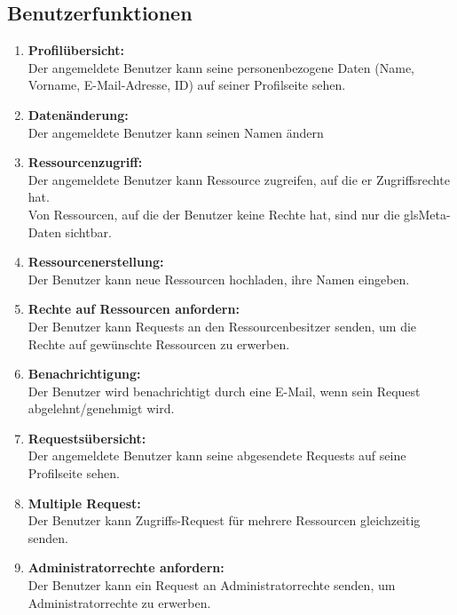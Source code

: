 \documentclass[parskip=full,11pt]{scrartcl}
\def\threedigits#1{%
  \ifnum#1<10 0\fi
  \ifnum#1<1 0\fi
  \number#1}
\begin{document}
\subsection{Benutzerfunktionen}
\begin{enumerate}[label={\textbf{/F\protect\threedigits{\theenumi}0/}}, leftmargin=*]
\item \label{FAB1} \textbf{Profilübersicht:} \\ Der angemeldete Benutzer kann seine personenbezogene Daten (Name, Vorname, E-Mail-Adresse, ID) auf seiner Profilseite sehen.
\item \label{FAB2} \textbf{Datenänderung:} \\ Der angemeldete Benutzer kann seinen Namen ändern
\item \label{FAB3} \textbf{Ressourcenzugriff:} \\Der angemeldete Benutzer kann Ressource zugreifen, auf die er Zugriffsrechte hat.
\\ Von Ressourcen, auf die der Benutzer keine Rechte hat, sind nur die gls{Meta-Daten} sichtbar.
\item \label{FAB4} \textbf{Ressourcenerstellung:}\\ Der Benutzer kann neue Ressourcen hochladen, ihre Namen eingeben.
\item \label{FAB5} \textbf{Rechte auf Ressourcen anfordern:}\\ Der Benutzer kann Requests an den Ressourcenbesitzer senden, um die Rechte auf gewünschte Ressourcen zu erwerben.
\item \label{FAB6} \textbf{Benachrichtigung:}\\ Der Benutzer wird benachrichtigt durch eine E-Mail, wenn sein Request abgelehnt/genehmigt wird. 
\item \label{FAB7} \textbf{Requestsübersicht:}\\ Der angemeldete Benutzer kann seine abgesendete Requests auf seine Profilseite sehen.
\item \label{FAB8} \colorbox{shadecolor} {\textbf{Multiple Request:}}\\ Der Benutzer kann Zugriffs-Request für mehrere Ressourcen gleichzeitig senden.
\item \label{FAB9} \colorbox{shadecolor} {\textbf{Administratorrechte anfordern:}}\\ Der Benutzer kann ein Request an Administratorrechte senden, um Administratorrechte zu erwerben.


\end{enumerate}
\end{document}

